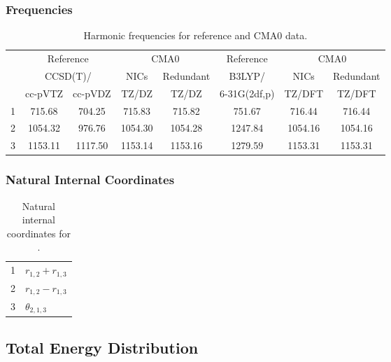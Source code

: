 \documentclass[10pt,oneside]{article}
\begin{document}
\begin{table}[h!]
\subsubsection*{Frequencies}
\centering
\caption{Harmonic frequencies for reference and CMA0 data.}
\begin{tabular}{cccccccc}
\toprule
{} & \multicolumn{2}{c}{Reference} & \multicolumn{2}{c}{CMA0} &    Reference & \multicolumn{2}{c}{CMA0} \\
{} & \multicolumn{2}{c}{CCSD(T)/} &    NICs &  Redundant &       B3LYP/ &    NICs & Redundant \\
{} &   cc-pVTZ & cc-pVDZ &   TZ/DZ &      TZ/DZ & 6-31G(2df,p) &  TZ/DFT &    TZ/DFT \\
\midrule
1 &    715.68 &  704.25 &  715.83 &     715.82 &       751.67 &  716.44 &    716.44 \\
2 &   1054.32 &  976.76 & 1054.30 &    1054.28 &      1247.84 & 1054.16 &   1054.16 \\
3 &   1153.11 & 1117.50 & 1153.14 &    1153.16 &      1279.59 & 1153.31 &   1153.31 \\
\bottomrule
\end{tabular}
\end{table}

\begin{table}[h!]
\subsubsection*{Natural Internal Coordinates}
\centering
\caption{Natural internal coordinates for .}
\small
\begin{tabular}{ll}
\toprule
  1   & $r_{1,2} + r_{1,3}$ \\
  2   & $r_{1,2} - r_{1,3}$ \\
  3   & $\theta_{2,1,3}$ \\
\bottomrule
\end{tabular}
\end{table}

\begin{table}
\subsection*{Total Energy Distribution}
\centering\end{table}

\clearpage

\subsection{}
\end{document}
